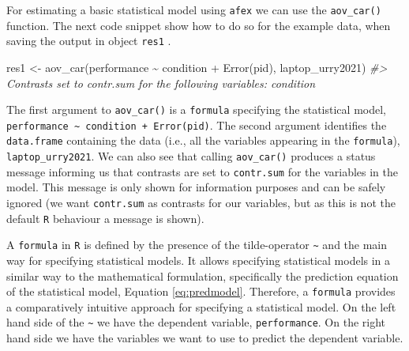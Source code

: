 \documentclass[
]{book}
\newenvironment{Shaded}{\begin{snugshade}}{\end{snugshade}}
\newcommand{\CommentTok}[1]{\textcolor[rgb]{0.56,0.35,0.01}{\textit{#1}}}
\newcommand{\FunctionTok}[1]{\textcolor[rgb]{0.00,0.00,0.00}{#1}}
\newcommand{\NormalTok}[1]{#1}
\newcommand{\OtherTok}[1]{\textcolor[rgb]{0.56,0.35,0.01}{#1}}
\newcommand{\SpecialCharTok}[1]{\textcolor[rgb]{0.00,0.00,0.00}{#1}}
\begin{document}
For estimating a basic statistical model using \texttt{afex} we can use the \texttt{aov\_car()} function. The next code snippet show how to do so for the example data, when saving the output in object \texttt{res1} .

\begin{Shaded}
\begin{Highlighting}[]
\NormalTok{res1 }\OtherTok{\textless{}{-}} \FunctionTok{aov\_car}\NormalTok{(performance }\SpecialCharTok{\textasciitilde{}}\NormalTok{ condition }\SpecialCharTok{+} \FunctionTok{Error}\NormalTok{(pid), laptop\_urry2021)}
\CommentTok{\#\textgreater{} Contrasts set to contr.sum for the following variables: condition}
\end{Highlighting}
\end{Shaded}

The first argument to \texttt{aov\_car()} is a \texttt{formula} specifying the statistical model, \texttt{performance\ \textasciitilde{}\ condition\ +\ Error(pid)}. The second argument identifies the \texttt{data.frame} containing the data (i.e., all the variables appearing in the \texttt{formula}), \texttt{laptop\_urry2021}. We can also see that calling \texttt{aov\_car()} produces a status message informing us that contrasts are set to \texttt{contr.sum} for the variables in the model. This message is only shown for information purposes and can be safely ignored (we want \texttt{contr.sum} as contrasts for our variables, but as this is not the default \texttt{R} behaviour a message is shown).

A \texttt{formula} in \texttt{R} is defined by the presence of the tilde-operator \texttt{\textasciitilde{}} and the main way for specifying statistical models. It allows specifying statistical models in a similar way to the mathematical formulation, specifically the prediction equation of the statistical model, Equation \eqref{eq:predmodel}. Therefore, a \texttt{formula} provides a comparatively intuitive approach for specifying a statistical model. On the left hand side of the \texttt{\textasciitilde{}} we have the dependent variable, \texttt{performance}. On the right hand side we have the variables we want to use to predict the dependent variable.
\end{document}
